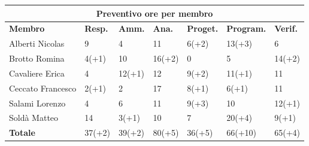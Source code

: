 \documentclass[a4paper, 12pt]{article}
\begin{document}
\begin{center}
	\begin{tabularx}{\textwidth}{|X|X|X|X|X|X|X|}
		\hline
		\multicolumn{7}{|c|}{\textbf{Preventivo ore per membro}}                                            \\
		\hline
		\hline
		\textbf{Membro}   & \textbf{Resp.}    & \textbf{Amm.}   & \textbf{Ana.} &
		\textbf{Proget.}  & \textbf{Program.} & \textbf{Verif.}                                             \\
		\hline
		Alberti Nicolas   & 9                 & 4               & 11            & 6(+2)  & 13(+3)  & 6      \\
		\hline
		Brotto Romina     & 4(+1)            & 10              & 16(+2)        & 0      & 5       & 14(+2) \\
		\hline
		Cavaliere Erica   & 4                 & 12(+1)          & 12            & 9(+2)  & 11(+1)  & 11     \\
		\hline
		Ceccato Francesco & 2(+1)             & 2               & 17            & 8(+1)  & 6(+1)   & 11     \\
		\hline
		Salami Lorenzo    & 4                 & 6               & 11            & 9(+3)  & 10      & 12(+1) \\
		\hline
		Soldà Matteo      & 14                & 3(+1)           & 10            & 7      & 20(+4)  & 9(+1)  \\
		\hline
		\hline
		\textbf{Totale}   & 37(+2)            & 39(+2)          & 80(+5)        & 36(+5) & 66(+10) & 65(+4) \\
		\hline
	\end{tabularx}\\[8pt]
	\mbox{}\\
\end{center}

\newpage
\end{document}
